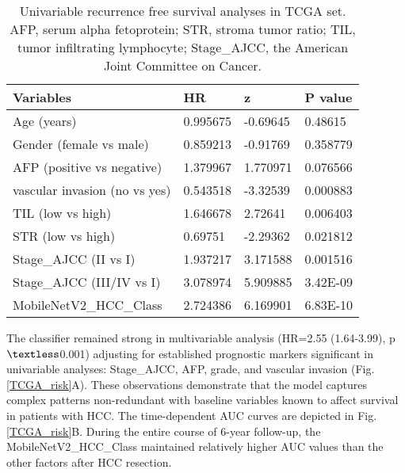 \documentclass{article}
\begin{document}
\begin{table}[]
	\centering
	\begin{tabular}{|l|l|l|l|}
		\hline
		Variables                     & HR       & z        & P value  \\ \hline
		Age (years)                   & 0.995675 & -0.69645 & 0.48615  \\ \hline
		Gender (female vs male)       & 0.859213 & -0.91769 & 0.358779 \\ \hline
		AFP (positive vs negative)    & 1.379967 & 1.770971 & 0.076566 \\ \hline
		vascular invasion (no vs yes) & 0.543518 & -3.32539 & 0.000883 \\ \hline
		TIL (low vs high)             & 1.646678 & 2.72641  & 0.006403 \\ \hline
		STR (low vs high)             & 0.69751  & -2.29362 & 0.021812 \\ \hline
		Stage\_AJCC (II vs I)         & 1.937217 & 3.171588 & 0.001516 \\ \hline
		Stage\_AJCC (III/IV vs I)     & 3.078974 & 5.909885 & 3.42E-09 \\ \hline
		MobileNetV2\_HCC\_Class       & 2.724386 & 6.169901 & 6.83E-10 \\ \hline
	\end{tabular}
	\caption{Univariable recurrence free survival analyses in TCGA set. AFP, serum alpha fetoprotein; STR, stroma tumor ratio; TIL, tumor infiltrating lymphocyte; Stage\_AJCC, the American Joint Committee on Cancer.}
	\label{TCGA-tab}
\end{table}


The classifier remained strong in multivariable analysis (HR=2.55 (1.64-3.99), p$\textless$0.001) adjusting for established prognostic markers significant in univariable analyses: Stage\_AJCC, AFP, grade, and vascular invasion (Fig. \ref{TCGA_risk}A). These observations demonstrate that the model captures complex patterns non-redundant with baseline variables known to affect survival in patients with HCC. The time-dependent AUC curves are depicted in Fig. \ref{TCGA_risk}B. During the entire course of 6-year follow-up, the MobileNetV2\_HCC\_Class maintained relatively higher AUC values than the other factors after HCC resection. 
\end{document}
